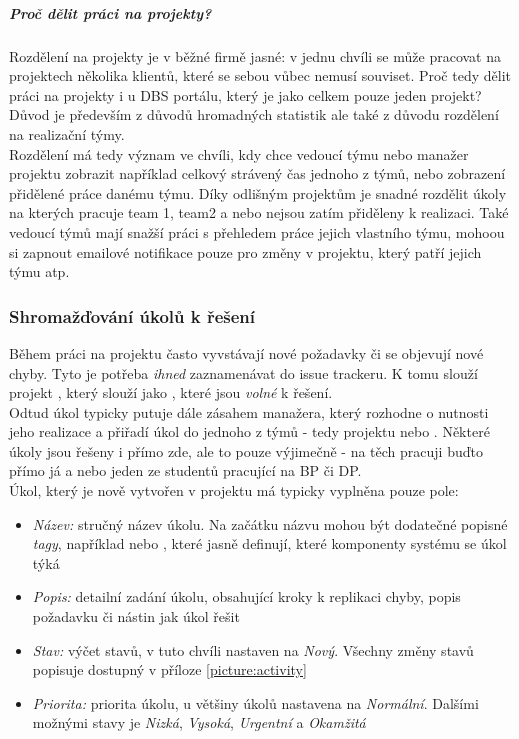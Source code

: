 \subparagraph{Proč dělit práci na projekty?}
Rozdělení na projekty je v běžné firmě jasné: v jednu chvíli se může pracovat na projektech několika klientů, které se sebou vůbec nemusí souviset. Proč tedy dělit práci na projekty i u DBS portálu, který je jako celkem pouze jeden projekt? Důvod je především z důvodů hromadných statistik ale také z důvodu rozdělení na realizační týmy.\\
Rozdělení má tedy význam ve chvíli, kdy chce vedoucí týmu nebo manažer projektu zobrazit například celkový strávený čas jednoho z týmů, nebo zobrazení přidělené práce danému týmu. Díky odlišným projektům je snadné rozdělit úkoly na kterých pracuje team 1, team2 a nebo nejsou zatím přiděleny k realizaci. Také vedoucí týmů mají snažší práci s přehledem práce jejich vlastního týmu, mohoou si zapnout emailové notifikace pouze pro změny v projektu, který patří jejich týmu atp.

\subsubsection{Shromažďování úkolů k řešení}

Během práci na projektu často vyvstávají nové požadavky či se objevují nové chyby. Tyto je potřeba \emph{ihned} zaznamenávat do issue trackeru. K tomu slouží projekt , který slouží jako , které jsou \emph{volné} k řešení.\\
Odtud úkol typicky putuje dále zásahem manažera, který rozhodne o nutnosti jeho realizace a přiřadí úkol do jednoho z týmů - tedy projektu  nebo . Některé úkoly jsou řešeny i přímo zde, ale to pouze výjimečně - na těch pracuji buďto přímo já a nebo jeden ze studentů pracující na BP či DP.\\
Úkol, který je nově vytvořen v  projektu má typicky vyplněna pouze pole:
\begin{itemize}
	\item \emph{Název:} stručný název úkolu. Na začátku názvu mohou být dodatečné popisné \emph{tagy}, například \code{[databaze]} nebo \code{[menu]}, které jasně definují, které komponenty systému se úkol týká
	\item \emph{Popis:} detailní zadání úkolu, obsahující kroky k replikaci chyby, popis požadavku či nástin jak úkol řešit
	\item \emph{Stav:} výčet stavů, v tuto chvíli nastaven na \emph{Nový}. Všechny změny stavů popisuje  dostupný v příloze \ref{picture:activity}
	\item \emph{Priorita:} priorita úkolu, u většiny úkolů nastavena na \emph{Normální}. Dalšími možnými stavy je \emph{Nizká}, \emph{Vysoká}, \emph{Urgentní} a \emph{Okamžitá}
\end{itemize}

